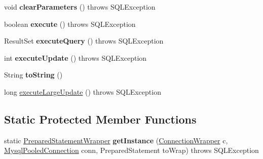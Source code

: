 \begin{DoxyCompactItemize}
void {\bfseries clear\+Parameters} ()  throws S\+Q\+L\+Exception 
\item 
\mbox{\label{classcom_1_1mysql_1_1jdbc_1_1jdbc2_1_1optional_1_1_prepared_statement_wrapper_a93297fb0215242e6eb243938640adf26}} 
boolean {\bfseries execute} ()  throws S\+Q\+L\+Exception 
\item 
\mbox{\label{classcom_1_1mysql_1_1jdbc_1_1jdbc2_1_1optional_1_1_prepared_statement_wrapper_a64a498d9e3732dd3abdf814bf3ea383a}} 
Result\+Set {\bfseries execute\+Query} ()  throws S\+Q\+L\+Exception 
\item 
\mbox{\label{classcom_1_1mysql_1_1jdbc_1_1jdbc2_1_1optional_1_1_prepared_statement_wrapper_a45d13341e758326e90fd1aeb95a0220d}} 
int {\bfseries execute\+Update} ()  throws S\+Q\+L\+Exception 
\item 
\mbox{\label{classcom_1_1mysql_1_1jdbc_1_1jdbc2_1_1optional_1_1_prepared_statement_wrapper_a4a1f0666b8562f53414f1f5fdc3426ec}} 
String {\bfseries to\+String} ()
\item 
long \mbox{\hyperlink{classcom_1_1mysql_1_1jdbc_1_1jdbc2_1_1optional_1_1_prepared_statement_wrapper_a1f0b555d50300bcf401077aa6b187eda}{execute\+Large\+Update}} ()  throws S\+Q\+L\+Exception 
\end{DoxyCompactItemize}
\subsection*{Static Protected Member Functions}
\begin{DoxyCompactItemize}
\item 
\mbox{\label{classcom_1_1mysql_1_1jdbc_1_1jdbc2_1_1optional_1_1_prepared_statement_wrapper_aa248f765ab6f13d203d6edae3ee798b3}} 
static \mbox{\hyperlink{classcom_1_1mysql_1_1jdbc_1_1jdbc2_1_1optional_1_1_prepared_statement_wrapper}{Prepared\+Statement\+Wrapper}} {\bfseries get\+Instance} (\mbox{\hyperlink{classcom_1_1mysql_1_1jdbc_1_1jdbc2_1_1optional_1_1_connection_wrapper}{Connection\+Wrapper}} c, \mbox{\hyperlink{classcom_1_1mysql_1_1jdbc_1_1jdbc2_1_1optional_1_1_mysql_pooled_connection}{Mysql\+Pooled\+Connection}} conn, Prepared\+Statement to\+Wrap)  throws S\+Q\+L\+Exception 
\end{DoxyCompactItemize}
